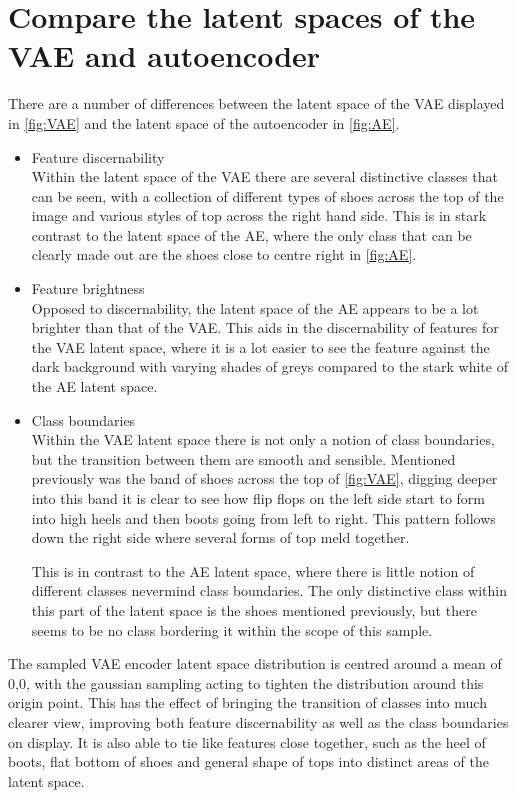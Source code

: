 \documentclass[sigconf]{acmart}
\begin{document}
\section{Compare the latent spaces of the VAE and autoencoder}
There are a number of differences between the latent space of the VAE displayed in \autoref{fig:VAE} and the latent space of the autoencoder in \autoref{fig:AE}.
\begin{itemize}
    \item Feature discernability\\
        Within the latent space of the VAE there are several distinctive classes that can be seen, with a collection of different types of shoes across the top of the image and various styles of top across the right hand side.
        This is in stark contrast to the latent space of the AE, where the only class that can be clearly made out are the shoes close to centre right in \autoref{fig:AE}.\\
    \item Feature brightness\\
        Opposed to discernability, the latent space of the AE appears to be a lot brighter than that of the VAE. 
        This aids in the discernability of features for the VAE latent space, where it is a lot easier to see the feature against the dark background with varying shades of greys compared to the stark white of the AE latent space.\\
    \item Class boundaries\\
        Within the VAE latent space there is not only a notion of class boundaries, but the transition between them are smooth and sensible. 
        Mentioned previously was the band of shoes across the top of \autoref{fig:VAE}, digging deeper into this band it is clear to see how flip flops on the left side start to form into high heels and then boots going from left to right.
        This pattern follows down the right side where several forms of top meld together.

        This is in contrast to the AE latent space, where there is little notion of different classes nevermind class boundaries. The only distinctive class within this part of the latent space is the shoes mentioned previously, but there seems to be no class bordering it within the scope of this sample.
\end{itemize}

The sampled VAE encoder latent space distribution is centred around a mean of 0,0, with the gaussian sampling acting to tighten the distribution around this origin point. This has the effect of bringing the transition of classes into much clearer view, improving both feature discernability as well as the class boundaries on display.
It is also able to tie like features close together, such as the heel of boots, flat bottom of shoes and general shape of tops into distinct areas of the latent space.
\end{document}
